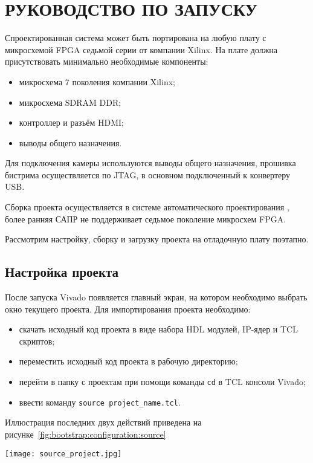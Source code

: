 \section{РУКОВОДСТВО ПО ЗАПУСКУ}
\label{sec:bootstrap}

Спроектированная система может быть портирована на любую плату с
микросхемой FPGA седьмой серии от компании Xilinx. На плате
должна присутствовать минимально необходимые компоненты:
\begin{itemize}
  \item микросхема 7 поколения компании Xilinx;
  \item микросхема SDRAM DDR;
  \item контроллер и разъём HDMI;
  \item выводы общего назначения.
\end{itemize}

Для подключения камеры используются выводы общего назначения,
прошивка бистрима осуществляется по JTAG, в основном
подключенный к конвертеру USB.

Сборка проекта осуществляется в системе автоматического проектирования
, более ранняя САПР  не поддерживает
седьмое поколение микросхем FPGA.

Рассмотрим настройку, сборку и загрузку проекта на отладочную плату
поэтапно.

\subsection{Настройка проекта}
\label{sec:bootstrap:configuration}

После запуска Vivado появляется главный экран, на котором необходимо выбрать
окно текущего проекта. Для импортирования проекта необходимо:
\begin{itemize}
  \item скачать исходный код проекта в виде набора HDL модулей, IP-ядер и TCL скриптов;
  \item переместить исходный код проекта в рабочую директорию;
  \item перейти в папку с проектам при помощи команды \texttt{cd} в TCL консоли Vivado;
  \item ввести команду \texttt{source project\_name.tcl}.
\end{itemize}

Иллюстрация последних двух действий приведена на рисунке~\ref{fig:bootstrap:configuration:source}

\begin{center}
  \centering
  \texttt{[image: source\_project.jpg]}
  \label{fig:bootstrap:configuration:source}
\end{center}

